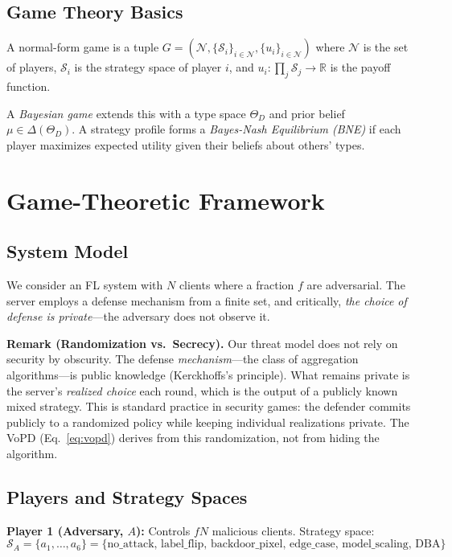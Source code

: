 \documentclass{article}
\newcommand{\SA}{\mathcal{S}_A}
\newcommand{\ThetaD}{\Theta_D}
\begin{document}
\subsection{Game Theory Basics}

A normal-form game is a tuple $G = (\mathcal{N}, \{\mathcal{S}_i\}_{i \in \mathcal{N}}, \{u_i\}_{i \in \mathcal{N}})$ where $\mathcal{N}$ is the set of players, $\mathcal{S}_i$ is the strategy space of player $i$, and $u_i: \prod_j \mathcal{S}_j \to \mathbb{R}$ is the payoff function.

A \emph{Bayesian game} extends this with a type space $\ThetaD$ and prior belief $\mu \in \Delta(\ThetaD)$. A strategy profile forms a \emph{Bayes-Nash Equilibrium (BNE)} if each player maximizes expected utility given their beliefs about others' types.

\section{Game-Theoretic Framework}
\label{sec:framework}

\subsection{System Model}

We consider an FL system with $N$ clients where a fraction $f$ are adversarial. The server employs a defense mechanism from a finite set, and critically, \emph{the choice of defense is private}---the adversary does not observe it.

\textbf{Remark (Randomization vs.\ Secrecy).} Our threat model does not rely on security by obscurity. The defense \emph{mechanism}---the class of aggregation algorithms---is public knowledge (Kerckhoffs's principle). What remains private is the server's \emph{realized choice} each round, which is the output of a publicly known mixed strategy. This is standard practice in security games: the defender commits publicly to a randomized policy while keeping individual realizations private. The VoPD (Eq.~\ref{eq:vopd}) derives from this randomization, not from hiding the algorithm.

\subsection{Players and Strategy Spaces}

\textbf{Player 1 (Adversary, $A$):} Controls $fN$ malicious clients. Strategy space:
\begin{equation}
    \SA = \{a_1, \ldots, a_6\} = \{\text{no\_attack, label\_flip, backdoor\_pixel, edge\_case, model\_scaling, DBA}\}
\end{equation}
\end{document}
